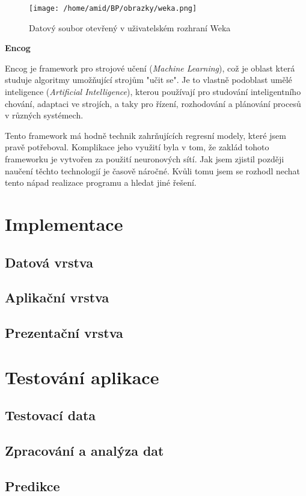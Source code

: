 \documentclass[a4paper,12pt,twoside]{scrreprt}
\begin{document}
\begin{figure}[h]
  \centering
  \texttt{[image: /home/amid/BP/obrazky/weka.png]}
  \caption{Datový soubor otevřený v uživatelském rozhraní Weka}
  \label{fig:weka}
\end{figure}

\textbf{Encog}

Encog je framework pro strojové učení (\textit{Machine Learning}), což je oblast která studuje algoritmy umožňující strojům "učit se". Je to vlastně podoblast umělé inteligence (\textit{Artificial Intelligence}), kterou používají pro studování inteligentního chování, adaptaci ve strojích, a taky pro řízení, rozhodování a plánování procesů v různých systémech.

Tento framework má hodně technik zahrňujících regresní modely, které jsem pravě potřeboval. Komplikace jeho využití byla v tom, že zaklád tohoto frameworku je vytvořen za použití neuronových sítí. Jak jsem zjistil později naučení těchto technologií je časově náročné. Kvůli tomu jsem se rozhodl nechat tento nápad realizace programu a hledat jiné řešení. 



\section{Implementace}
\subsection{Datová vrstva}
\subsection{Aplikační vrstva}
\subsection{Prezentační vrstva}

\section{Testování aplikace}
\subsection{Testovací data}
\subsection{Zpracování a analýza dat}
\subsection{Predikce}
\end{document}
